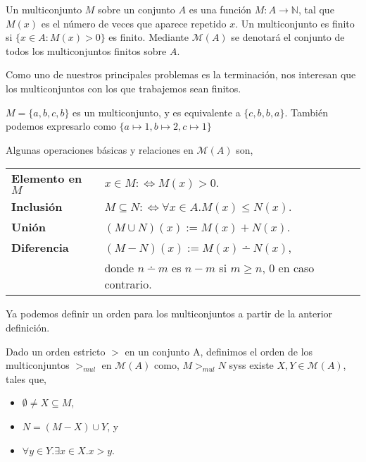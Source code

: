 \begin{defi}
  Un multiconjunto $M$ sobre un conjunto $A$ es una función
  $M : A \rightarrow \mathbb{N}$, tal que $M(x)$ es el número de veces que
  aparece repetido $x$. Un multiconjunto es finito si $\{x \in A : M(x) > 0\}$
  es finito. Mediante $\mathcal{M}(A)$ se denotará el conjunto de todos los
  multiconjuntos finitos sobre $A$.
\end{defi}

Como uno de nuestros principales problemas es la terminación, nos interesan que
los multiconjuntos con los que trabajemos sean finitos.

\begin{ejem} 
  $M = \{a,b,c,b\}$ es un multiconjunto, y es equivalente a
  $\{c,b,b,a\}$. También podemos expresarlo como
  $\{a\mapsto 1, b \mapsto 2, c\mapsto 1\}$
\end{ejem}

\begin{defi} 
  Algunas operaciones básicas y relaciones en $\mathcal{M}(A)$ son, \\
  \begin{tabular}{ll}
    \textbf{Elemento en $M$}
    & $x \in M :\Leftrightarrow M(x) > 0$. \\
    \textbf{Inclusión}     
    & $M \subseteq N :\Leftrightarrow \forall x \in A. M(x) \leq N(x)$. \\ 
    \textbf{Unión}        
    & $(M \cup N)(x) := M(x) + N(x)$.   \\ 
    \textbf{Diferencia}   
    & $(M - N)(x):= M(x) \dotminus N(x)$, \\ 
    & donde $n \dotminus m$ es $n-m$
      si $m \geq n$, 0 en caso contrario.     
  \end{tabular}
\end{defi}

Ya podemos definir un orden para los multiconjuntos a partir de la anterior
definición.

\begin{defi} 
  Dado un orden estricto $>$ en un conjunto A, definimos el orden de los
  multiconjuntos $>_{mul}$ en $\mathcal{M}(A)$ como, $M >_{mul} N$ syss existe
  $X, Y \in \mathcal{M}(A)$, tales que,
  \begin{itemize}
  \item $\emptyset \neq X \subseteq M$,
  \item $N = (M - X) \cup Y$, y 
  \item $\forall y \in Y. \exists x \in X. x>y$.
  \end{itemize}
\end{defi}

